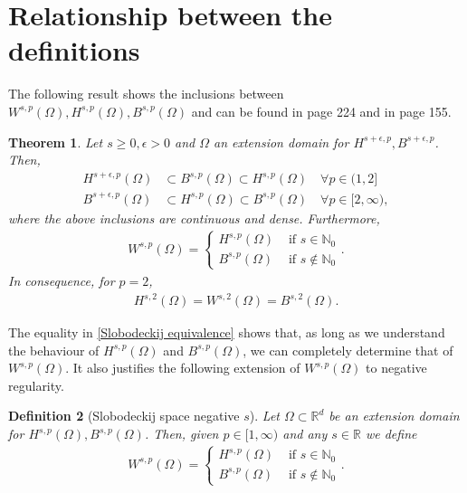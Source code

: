 \documentclass[
    a4paper,
    DIV=14,
    abstract=true,
    numbers=noenddot
]
{scrartcl}
\newtheorem{theorem}{Theorem}[section]
\newtheorem{definition}[theorem]{Definition}
\theoremstyle{definition}
\newcommand{\N}{\mathbb{N}}
\newcommand{\R}{\mathbb{R}}
\begin{document}
\section{Relationship between the definitions}
The following result shows the inclusions between $W^{s,p}(\Omega ),H^{s,p}(\Omega ),B^{s,p}(\Omega )$ and can be found in \cite{agranovich2015sobolev} page 224 and in \cite{stein1970singular} page 155.
\begin{theorem}\label{equivalence fractional spaces}
    Let $s \geq 0, \epsilon >0$ and  $\Omega$ an extension domain for $H^{s+\epsilon,p},B^{s+\epsilon,p}$. Then,
    \begin{align*}
        H^{s+\epsilon,p}(\Omega ) & \subset B^{s,p}(\Omega )  \subset H^{s,p}(\Omega )\quad \forall p \in (1,2]       \\
        B^{s+\epsilon,p}(\Omega ) & \subset H^{s,p}(\Omega )  \subset B^{s,p}(\Omega )\quad \forall p \in [2,\infty),
    \end{align*}
    where the above inclusions are continuous and dense. Furthermore,
    \begin{align}\label{Slobodeckij equivalence}
        W^{s,p}(\Omega )= \begin{cases}
                              H^{s,p}(\Omega ) & \text{ if } s \in \N_0    \\
                              B^{s,p}(\Omega ) & \text{ if } s \notin \N_0
                          \end{cases}.
    \end{align}
    In consequence, for $p=2$,
    \begin{align}\label{p=2}
        H^{s,2}(\Omega )=W^{s,2}(\Omega )=B^{s,2}(\Omega ).
    \end{align}
\end{theorem}
The equality in \eqref{Slobodeckij equivalence} shows that, as long as we understand the behaviour of $H^{s,p}(\Omega )$ and $B^{s,p}(\Omega )$, we can completely determine that of $W^{s,p}(\Omega )$. It also justifies the following extension of $W^{s,p}(\Omega )$ to negative regularity.
\begin{definition}[Slobodeckij space negative $s$]\label{negative s Slobodeckij}
    Let $\Omega \subset \R^d$ be an extension domain for $H^{s,p}(\Omega ), B^{s,p}(\Omega )$. Then, given $p \in [1,\infty)$ and any  $s \in \R$ we define
    \begin{align*}
        W^{s,p}(\Omega )= \begin{cases}
                              H^{s,p}(\Omega ) & \text{ if } s \in \N_0    \\
                              B^{s,p}(\Omega ) & \text{ if } s \notin \N_0
                          \end{cases}.
    \end{align*}
\end{definition}
\end{document}
